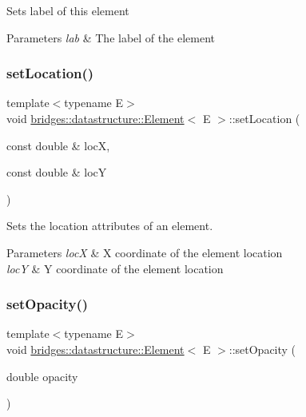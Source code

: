 Sets label of this element


\begin{DoxyParams}{Parameters}
{\em lab} & The label of the element \\
\hline
\end{DoxyParams}
\mbox{\label{classbridges_1_1datastructure_1_1_element_af3af017c9d6efcbc2124d0231b57e7a6}} 
\subsubsection{\texorpdfstring{set\+Location()}{setLocation()}}
{\footnotesize\ttfamily template$<$typename E$>$ \\
void \hyperlink{classbridges_1_1datastructure_1_1_element}{bridges\+::datastructure\+::\+Element}$<$ E $>$\+::set\+Location (\begin{DoxyParamCaption}\item[{const double \&}]{locX,  }\item[{const double \&}]{locY }\end{DoxyParamCaption})\hspace{0.3cm}{\ttfamily [inline]}}

Sets the location attributes of an element.


\begin{DoxyParams}{Parameters}
{\em locX} & X coordinate of the element location \\
\hline
{\em locY} & Y coordinate of the element location \\
\hline
\end{DoxyParams}
\mbox{\label{classbridges_1_1datastructure_1_1_element_acb5d0b5734a6b3c17b7b1784ae1dc79c}} 
\subsubsection{\texorpdfstring{set\+Opacity()}{setOpacity()}}
{\footnotesize\ttfamily template$<$typename E$>$ \\
void \hyperlink{classbridges_1_1datastructure_1_1_element}{bridges\+::datastructure\+::\+Element}$<$ E $>$\+::set\+Opacity (\begin{DoxyParamCaption}\item[{double}]{opacity }\end{DoxyParamCaption})\hspace{0.3cm}{\ttfamily [inline]}}

